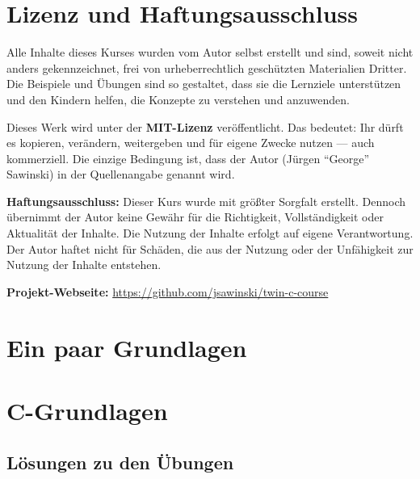 \documentclass[a4paper]{article}
\begin{document}
\vspace{1cm}

\section*{Lizenz und Haftungsausschluss}

Alle Inhalte dieses Kurses wurden vom Autor selbst erstellt und sind, 
soweit nicht anders gekennzeichnet, frei von urheberrechtlich geschützten 
Materialien Dritter. Die Beispiele und Übungen sind so gestaltet, dass sie 
die Lernziele unterstützen und den Kindern helfen, die Konzepte zu verstehen 
und anzuwenden.

Dieses Werk wird unter der \textbf{MIT-Lizenz} veröffentlicht. 
Das bedeutet: Ihr dürft es kopieren, verändern, weitergeben und 
für eigene Zwecke nutzen — auch kommerziell. Die einzige Bedingung ist, 
dass der Autor (Jürgen ``George'' Sawinski) in der Quellenangabe genannt wird.

\textbf{Haftungsausschluss:} 
Dieser Kurs wurde mit größter Sorgfalt erstellt. Dennoch übernimmt der Autor 
keine Gewähr für die Richtigkeit, Vollständigkeit oder Aktualität der Inhalte. 
Die Nutzung der Inhalte erfolgt auf eigene Verantwortung. Der Autor haftet nicht 
für Schäden, die aus der Nutzung oder der Unfähigkeit zur Nutzung der Inhalte 
entstehen.

\vspace{1cm}
\noindent
\textbf{Projekt-Webseite:} \url{https://github.com/jsawinski/twin-c-course}

\newpage

\section{Ein paar Grundlagen}
\label{sec:grundagen}

% 

\section{C-Grundlagen}

\newpage
\newpage
\newpage
\newpage


\appendix


\newpage\subsection{Lösungen zu den Übungen}
\printsolutions

\newpage

\end{document}
